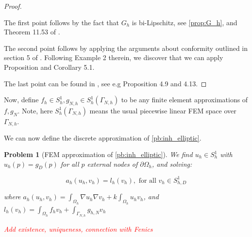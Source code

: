 \documentclass[english,a4paper,10pt,oneside]{scrbook}	%
\theoremstyle{break}
\newtheorem{pb}[equation]{Problem}
\newenvironment{mproof}[1][\proofname]{%
  \begin{proof}[#1]$ $\par\nobreak\ignorespaces
}{%
  \end{proof}
}
\renewcommand*{\proofname}{Proof}
\theoremstyle{remark}
\newcommand{\ds}{\displaystyle}
\begin{document}
\begin{mproof}

The first point follows by the fact that $G_h$ is bi-Lipschitz, see \cref{prop:G_h}, and Theorem 11.53 of \cite{leoni}.

%
%

The second point follows by applying the arguments about conformity outlined in section 5 of \cite{bernardi}. Following Example 2 therein, we discover that we can apply Proposition and Corollary 5.1.

The last point can be found in \cite{elliott}, see e.g Proposition 4.9 and 4.13.
%
%
%
%

\end{mproof}

Now, define $f_h \in S^1_h, g_{N,h} \in S^1_h(\Gamma_{N,h})$ to be any finite element approximations of $f, g_N$. Note, here $S^1_h(\Gamma_{N,h})$ means the usual piecewise linear FEM space over  $\Gamma_{N,h}$.

We can now define the discrete approximation of \cref{pb:inh_elliptic}.

\begin{pb}[FEM approximation of \cref{pb:inh_elliptic}]
We find $u_h \in S^1_h$ with $u_h(p)=g_D(p)$ for all $p$ external nodes of $\partial \Omega_h$, and solving:

$$a_h(u_h,v_h) = l_h(v_h), \text{ for all } v_h \in S^1_{h,D}$$

where $a_h(u_h,v_h) =\ds \int_{\Omega_h}\nabla u_h \nabla v_h + k \int_{\Omega_h} u_h  v_h$, and $l_h(v_h) =\ds \int_{\Omega_h}f_h v_h + \int_{\Gamma_{N,h}} g_{h,N}v_h$


\textcolor{red}{Add existence, uniqueness, connection with Fenics}

\end{pb}
\end{document}
